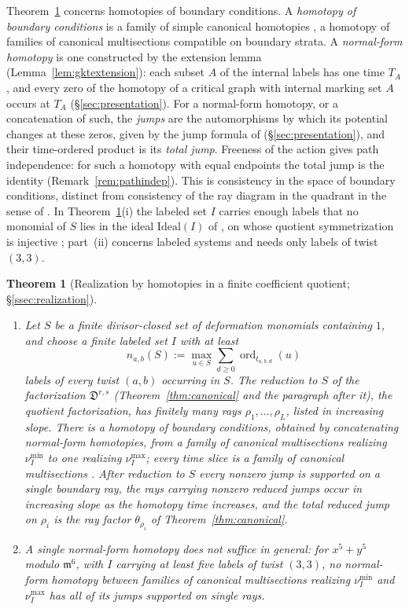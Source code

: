 \documentclass[11pt]{amsart}
\newtheorem{theorem}{Theorem}[section]
\theoremstyle{definition}
\theoremstyle{remark}
\newcommand{\Dscr}{\mathfrak{D}}
\begin{document}
Theorem~\ref{thm:georealization} concerns homotopies of boundary conditions.  A
\emph{homotopy of boundary conditions} is a family of simple canonical
homotopies \cite[Defs.~3.36--3.37]{GKT}, a homotopy of families of canonical
multisections compatible on boundary strata.  A \emph{normal-form homotopy}
is one constructed by the extension lemma \cite[Lem.~3.40]{GKT}
(Lemma~\ref{lem:gktextension}): each subset $A$ of the internal labels has
one time $T_A$, and every zero of the homotopy of a critical graph with
internal marking set $A$ occurs at $T_A$ (\S\ref{sec:presentation}).  For a
normal-form homotopy, or a concatenation of such, the \emph{jumps} are the
automorphisms by which its potential changes at these zeros, given by the
jump formula of \cite[proof of Thm.~5.9]{GKT} (\S\ref{sec:presentation}),
and their time-ordered product is its \emph{total jump}.  Freeness of the
action gives path independence: for such a homotopy with equal endpoints the
total jump is the identity (Remark~\ref{rem:pathindep}).  This is consistency
in the space of boundary conditions, distinct from consistency of the ray
diagram in the quadrant in the sense of \cite{GPS10}.  In
Theorem~\ref{thm:georealization}(i) the labeled set $I$ carries enough labels
that no monomial of $S$ lies in the ideal $\mathrm{Ideal}(I)$ of
\cite[Def.~4.10]{GKT}, on whose quotient symmetrization is injective
\cite[Lem.~4.14]{GKT}; part~(ii) concerns labeled systems and needs only
labels of twist $(3,3)$.

\begin{theorem}[Realization by homotopies in a finite coefficient quotient;
  \S\ref{ssec:realization}]
\label{thm:georealization}\mbox{}
\begin{enumerate}
\item[(i)] Let $S$ be a finite divisor-closed set of deformation monomials
containing $1$, and choose a finite labeled set $I$ with at least
\[
n_{a,b}(S):=\max_{u\in S}\sum_{d\ge0}\operatorname{ord}_{t_{a,b,d}}(u)
\]
labels of every twist $(a,b)$ occurring in $S$.  The reduction to $S$ of the
factorization $\Dscr^{r,s}$ (Theorem~\ref{thm:canonical} and the paragraph
after it), the \emph{quotient factorization}, has finitely many rays
$\rho_1,\dots,\rho_L$, listed in increasing slope.  There is a homotopy of
boundary conditions, obtained by concatenating normal-form homotopies, from a family of canonical multisections realizing
$\nu_I^{\min}$ to one realizing $\nu_I^{\max}$; every
time slice is a family of canonical multisections \cite[Def.~3.22]{GKT}.
After reduction to $S$ every nonzero
jump is supported on a single boundary ray, the rays carrying
nonzero reduced jumps occur in increasing slope as the homotopy time
increases, and the total reduced jump on $\rho_{i}$ is the ray factor
$\theta_{\rho_{i}}$ of Theorem~\ref{thm:canonical}.
\item[(ii)] A single normal-form homotopy does not suffice in general: for
$x^{5}+y^{5}$ modulo $\mathfrak m^{6}$, with $I$ carrying at least five labels
of twist $(3,3)$, no normal-form homotopy between families of canonical
multisections realizing $\nu_I^{\min}$ and $\nu_I^{\max}$ has all of its
jumps supported on single rays.
\end{enumerate}
\end{theorem}
\end{document}
